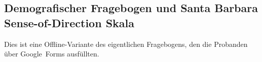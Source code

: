 \begin{appendices}
    \section*{Demografischer Fragebogen und Santa Barbara Sense-of-Direction Skala}
    \label{appendix:demographic}
    Dies ist eine Offline-Variante des eigentlichen Fragebogens, den die Probanden über Google~Forms ausfüllten.
    \begin{center}
    \end{center}
    

\end{appendices}
